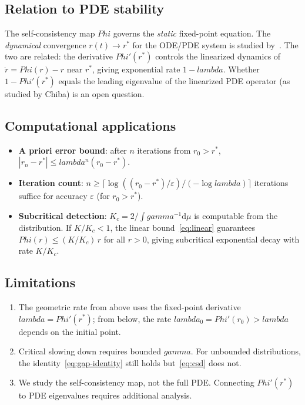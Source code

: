 \documentclass[11pt,a4paper]{article}
\let\Phi\relax\def\Phi{Phi}%
\let\lambda\relax\def\lambda{lambda}%
\let\gamma\relax\def\gamma{gamma}%
\theoremstyle{definition}
\begin{document}
\subsection{Relation to PDE stability}

The self-consistency map $\Phi$ governs the \emph{static} fixed-point equation. The \emph{dynamical} convergence $r(t) \to r^*$ for the ODE/PDE system is studied by~\cite{strogatz-mirollo1991,chiba2015,dietert2016}. The two are related: the derivative $\Phi'(r^*)$ controls the linearized dynamics of $\dot r = \Phi(r) - r$ near $r^*$, giving exponential rate $1 - \lambda$. Whether $1 - \Phi'(r^*)$ equals the leading eigenvalue of the linearized PDE operator (as studied by Chiba) is an open question.

\subsection{Computational applications}

\begin{itemize}[nosep]
\item \textbf{A priori error bound}: after $n$ iterations from $r_0 > r^*$, $|r_n - r^*| \leq \lambda^n(r_0 - r^*)$.
\item \textbf{Iteration count}: $n \geq \lceil \log((r_0-r^*)/\varepsilon)/(-\log\lambda) \rceil$ iterations suffice for accuracy $\varepsilon$ (for $r_0 > r^*$).
\item \textbf{Subcritical detection}: $K_c = 2/\!\int\gamma^{-1}\mathrm{d}\mu$ is computable from the distribution. If $K/K_c < 1$, the linear bound~\eqref{eq:linear} guarantees $\Phi(r) \leq (K/K_c)\,r$ for all $r > 0$, giving subcritical exponential decay with rate $K/K_c$.
\end{itemize}

\subsection{Limitations}

\begin{enumerate}[nosep]
\item The geometric rate from above uses the fixed-point derivative $\lambda = \Phi'(r^*)$; from below, the rate $\lambda_0 = \Phi'(r_0) > \lambda$ depends on the initial point.
\item Critical slowing down requires bounded $\gamma$. For unbounded distributions, the identity~\eqref{eq:gap-identity} still holds but~\eqref{eq:csd} does not.
\item We study the self-consistency map, not the full PDE. Connecting $\Phi'(r^*)$ to PDE eigenvalues requires additional analysis.
\end{enumerate}
\end{document}
